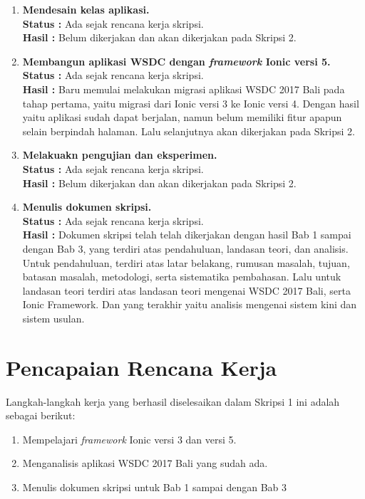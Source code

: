 \documentclass[a4paper,twoside]{article}
\begin{document}
\begin{enumerate}
		\item \textbf{Mendesain kelas aplikasi.}\\
		{\bf Status :} Ada sejak rencana kerja skripsi.\\
		{\bf Hasil :} Belum dikerjakan dan akan dikerjakan pada Skripsi 2.
		
		\item \textbf{Membangun aplikasi WSDC dengan \textit{framework} Ionic versi 5.}\\
		{\bf Status :} Ada sejak rencana kerja skripsi.\\
		{\bf Hasil :} Baru memulai melakukan migrasi aplikasi WSDC 2017 Bali pada tahap pertama, yaitu migrasi dari Ionic versi 3 ke Ionic versi 4. Dengan hasil yaitu aplikasi sudah dapat berjalan, namun belum memiliki fitur apapun selain berpindah halaman. Lalu selanjutnya akan dikerjakan pada Skripsi 2.
		
		\item \textbf{Melakuakn pengujian dan eksperimen.}\\
		{\bf Status :} Ada sejak rencana kerja skripsi.\\
		{\bf Hasil :} Belum dikerjakan dan akan dikerjakan pada Skripsi 2.
		
		\item \textbf{Menulis dokumen skripsi.}\\
		{\bf Status :} Ada sejak rencana kerja skripsi.\\
		{\bf Hasil :} Dokumen skripsi telah telah dikerjakan dengan hasil Bab 1 sampai dengan Bab 3, yang terdiri atas pendahuluan, landasan teori, dan analisis. Untuk pendahuluan, terdiri atas latar belakang, rumusan masalah, tujuan, batasan masalah, metodologi, serta sistematika pembahasan. Lalu untuk landasan teori terdiri atas landasan teori mengenai WSDC 2017 Bali, serta Ionic Framework. Dan yang terakhir yaitu analisis mengenai sistem kini dan sistem usulan.

	\end{enumerate}

\section{Pencapaian Rencana Kerja}
Langkah-langkah kerja yang berhasil diselesaikan dalam Skripsi 1 ini adalah sebagai berikut:
\begin{enumerate}
\item Mempelajari \textit{framework} Ionic versi 3 dan versi 5.
\item Menganalisis aplikasi WSDC 2017 Bali yang sudah ada.
\item Menulis dokumen skripsi untuk Bab 1 sampai dengan Bab 3
\end{enumerate}
\end{document}
